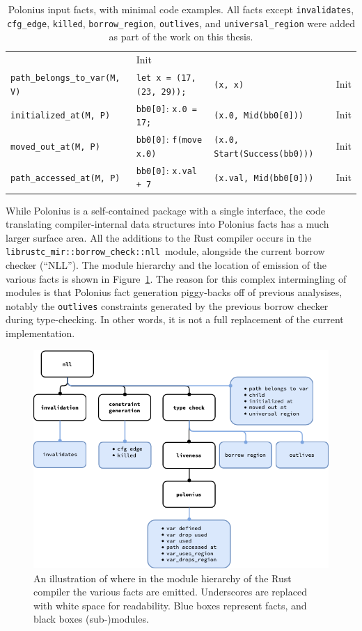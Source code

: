 \documentclass[11pt,a4paper,twoside,openany,draft]{report}
\newcommand{\InRust}[1]{\texttt{#1}}
\newcommand{\InDatalog}[1]{\texttt{#1}}
\begin{document}
{\begin{table}[!htbp]
\begin{tabular}{@{}l l@{} l@{} @{}l@{}}
       & Init  \\
  \InDatalog{path_belongs_to_var(M, V)} & \InRust{let x = (17, (23, 29));} & \InRust{(x, x)} & Init  \\
  \InDatalog{initialized_at(M, P)} & \InRust{bb0[0]}: \InRust{x.0 = 17;} & \InRust{(x.0, Mid(bb0[0]))} & Init  \\
  \InDatalog{moved_out_at(M, P)} & \InRust{bb0[0]}: \InRust{f(move x.0)} & \InRust{(x.0, Start(Success(bb0)))} & Init  \\
  \InDatalog{path_accessed_at(M, P)} & \InRust{bb0[0]}: \InRust{x.val + 7} & \InRust{(x.val, Mid(bb0[0]))} & Init
\end{tabular}
\caption[Input Facts to Polonius]{Polonius input facts, with minimal code
  examples. All facts except \texttt{invalidates}, \texttt{cfg\_edge},
  \texttt{killed}, \texttt{borrow\_region}, \texttt{outlives}, and
  \texttt{universal\_region} were added as part of the work on this thesis.}\label{tab:input-facts}
\end{table}%
}

While Polonius is a self-contained package with a single interface, the code
translating compiler-internal data structures into Polonius facts has a much
larger surface area. All the additions to the Rust compiler occurs in the
\texttt{librustc\_mir::borrow\_check::nll}~module, alongside the current borrow
checker (``NLL''). The module hierarchy and the location of emission of the
various facts is shown in Figure~\ref{fig:fact-module-hierarchy}. The reason for
this complex intermingling of modules is that Polonius fact generation
piggy-backs off of previous analysises, notably the \texttt{outlives}
constraints generated by the previous borrow checker during type-checking. In
other words, it is not a full replacement of the current implementation.

\begin{figure}
  \includegraphics[width=0.9\linewidth]{Graphs/rustc-module-structure}
  \caption[Polonius In Rust's Module Hierarchy]{An illustration of where in the
    module hierarchy of the Rust compiler the various facts are emitted.
    Underscores are replaced with white space for readability. Blue boxes
    represent facts, and black boxes (sub-)modules.}\label{fig:fact-module-hierarchy}
\end{figure}
\end{document}
